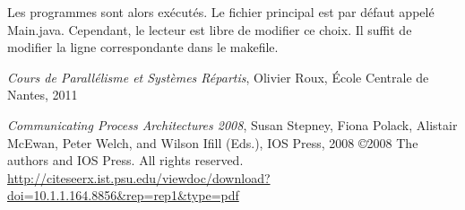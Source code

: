 \documentclass[a4paper,11pt,french]{report}
\begin{document}
Les programmes sont alors exécutés. Le fichier principal est par défaut appelé Main.java. Cependant, le lecteur est libre de modifier ce choix. Il suffit de modifier la ligne correspondante dans le makefile.

\begin{thebibliography}{Cpa2008}
 {\textit{Cours de Parallélisme et Systèmes Répartis}, Olivier Roux, \'Ecole Centrale de Nantes, 2011}

 {\textit{Communicating Process Architectures 2008}, Susan Stepney, Fiona Polack, Alistair McEwan, Peter Welch, and Wilson Ifill (Eds.), IOS Press, 2008
\copyright 2008 The authors and IOS Press. All rights reserved.\\
\url{http://citeseerx.ist.psu.edu/viewdoc/download?doi=10.1.1.164.8856&rep=rep1&type=pdf}}
\end{thebibliography}
\end{document}
